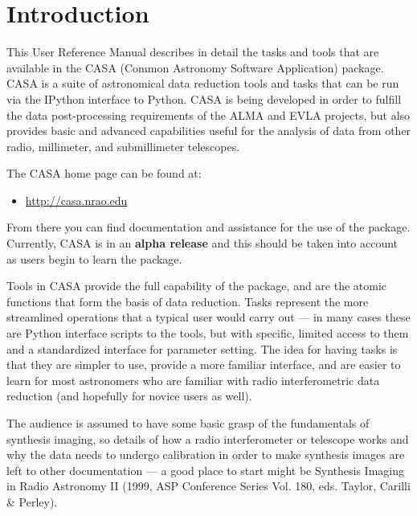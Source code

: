 

\chapter{Introduction}
\label{chapter:intro}


This User Reference Manual describes in detail the tasks and
tools that are available in the CASA (Common Astronomy
Software Application) package.  CASA is a suite of
astronomical data reduction tools and tasks that can be run via the
IPython interface to Python.  CASA is being developed in order to 
fulfill the data post-processing requirements of the ALMA and EVLA
projects, but also provides basic and advanced capabilities useful for
the analysis of data from other radio, millimeter, and submillimeter
telescopes.

The CASA home page can be found at:
\begin{itemize}
  \item \url{http://casa.nrao.edu}
\end{itemize}
From there you can find documentation and assistance for the use
of the package.
Currently, CASA is in an {\bf alpha release}
and this should be taken into account as users begin to learn the
package.

Tools in CASA provide the full capability of the package, and are the
atomic functions that form the basis of data reduction.  Tasks
represent the more streamlined operations that a typical user would
carry out --- in many cases these are Python interface scripts to the
tools, but with specific, limited access to them and a standardized
interface for parameter setting.  The idea for having tasks is that
they are simpler to use, provide a more familiar interface, and are
easier to learn for most astronomers who are familiar with radio
interferometric data reduction (and hopefully for novice users as well).

The audience is assumed to have some basic grasp of
the fundamentals of synthesis imaging, so details of how a radio
interferometer or telescope works and why the data needs to undergo
calibration in order to make synthesis images are left to other
documentation --- a good place to start might be Synthesis Imaging in
Radio Astronomy II (1999, ASP Conference Series Vol. 180, eds. Taylor,
Carilli \& Perley).

